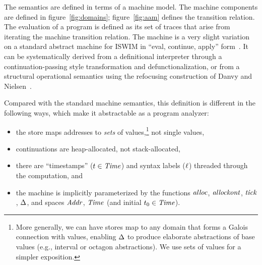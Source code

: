 \documentclass[preprint,onecolumn,9pt]{sigplanconf} %
\begin{document}
The semantics are defined in terms of a machine model.  The machine
components are defined in figure~\ref{fig:domains};
figure~\ref{fig:aam} defines the transition relation.  The evaluation
of a program is defined as its set of traces that arise from iterating the
machine transition relation.  The
machine is a very slight variation on a standard abstract machine for
ISWIM in ``eval, continue, apply'' form~\cite{dvanhorn:Danvy:DSc}.  It
can be systematically derived from a definitional interpreter through
a continuation-passing style transformation and defunctionalization,
or from a structural operational semantics using the refocusing
construction of Danvy and
Nielsen~\cite{dvanhorn:Danvy-Nielsen:RS-04-26}.

Compared with the standard machine semantics, this definition is
different in the following ways, which make it abstractable as a
program analyzer:
\begin{itemize}
\item the store maps addresses to \emph{sets} of values,\footnote{
More generally, we can have stores map to any domain that forms
 a Galois connection with values, enabling $\Delta$ to
produce elaborate abstractions of base values (e.g., interval or octagon
abstractions). We use sets of values for a simpler exposition.
} not
  single values,

\item continuations are heap-allocated, not stack-allocated,
\item there are ``timestamps'' (${t} \in \mathit{Time}$) and syntax
  labels (${\ell}$) threaded through the computation, and
\item the machine is implicitly parameterized by the functions
  $\mathit{alloc}$, $\mathit{allockont}$, $\mathit{tick}$, $\Delta$, and spaces
  $\mathit{Addr}$, $\mathit{Time}$ (and initial ${t}_0 \in \mathit{Time}$).
\end{itemize}
\end{document}
